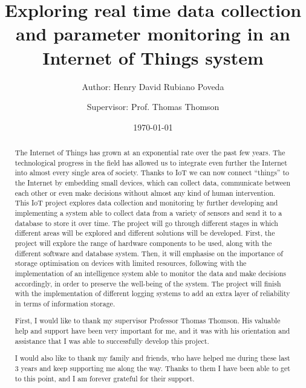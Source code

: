 \documentclass[12pt]{article}
\title{Exploring real time data collection and parameter monitoring in an Internet of Things system}
\author{Author: Henry David Rubiano Poveda \and Supervisor: Prof. Thomas Thomson}
\date{\today}
\begin{document}
\maketitle
\newpage

\begin{abstract}
    The Internet of Things has grown at an exponential rate over the past few years. The technological progress in the field has allowed us to integrate even further the Internet into almost every single area of society. Thanks to IoT we can now connect ``things'' to the Internet by embedding small devices, which can collect data, communicate between each other or even make decisions without almost any kind of human intervention. This IoT project explores data collection and monitoring by further developing and implementing a system able to collect data from a variety of sensors and send it to a database to store it over time. The project will go through different stages in which different areas will be explored and different solutions will be developed. First, the project will explore the range of hardware components to be used, along with the different software and database system. Then, it will emphasise on the importance of storage optimisation on devices with limited resources, following with the implementation of an intelligence system able to monitor the data and make decisions accordingly, in order to preserve the well-being of the system. The project will finish with the implementation of different logging systems to add an extra layer of reliability in terms of information storage. 

\end{abstract}
\newpage

\renewcommand{\abstractname}{Acknowledgements}
\begin{abstract}
    \setlength{\parskip}{1em}

    First, I would like to thank my supervisor Professor Thomas Thomson. His valuable help and support have been very important for me, and it was with his orientation and assistance that I was able to successfully develop this project. \par

    I would also like to thank my family and friends, who have helped me during these last 3 years and keep supporting me along the way. Thanks to them I have been able to get to this point, and I am forever grateful for their support.

\end{abstract}
\newpage
\end{document}

